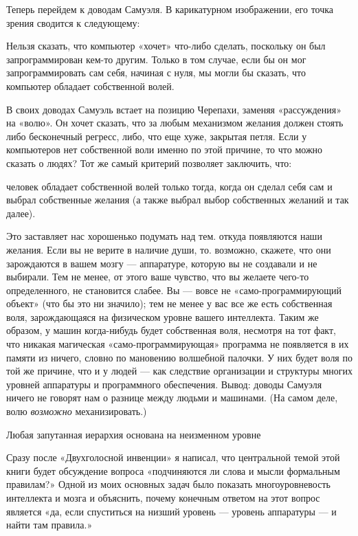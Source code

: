Теперь перейдем к доводам Самуэля. В карикатурном изображении, его точка зрения сводится к следующему:

Нельзя сказать, что компьютер «хочет» что-либо сделать, поскольку он был запрограммирован кем-то другим. Только в том случае, если бы он мог запрограммировать сам себя, начиная с нуля, мы могли бы сказать, что компьютер обладает собственной волей.

В своих доводах Самуэль встает на позицию Черепахи, заменяя «рассуждения» на «волю». Он хочет сказать, что за любым механизмом желания должен стоять либо бесконечный регресс, либо, что еще хуже, закрытая петля. Если у компьютеров нет собственной воли именно по этой причине, то что можно сказать о людях? Тот же самый критерий позволяет заключить, что:

человек обладает собственной волей только тогда, когда он сделал себя сам и выбрал собственные желания (а также выбрал выбор собственных желаний и так далее).

Это заставляет нас хорошенько подумать над тем. откуда появляются наши желания. Если вы не верите в наличие души, то. возможно, скажете, что они зарождаются в вашем мозгу --- аппаратуре, которую вы не создавали и не выбирали. Тем не менее, от этого ваше чувство, что вы желаете чего-то определенного, не становится слабее. Вы --- вовсе не «само-программирующий объект» (что бы это ни значило); тем не менее у вас все же есть собственная воля, зарождающаяся на физическом уровне вашего интеллекта. Таким же образом, у машин когда-нибудь будет собственная воля, несмотря на тот факт, что никакая магическая «само-программирующая» программа не появляется в их памяти из ничего, словно по мановению волшебной палочки. У них будет воля по той же причине, что и у людей --- как следствие организации и структуры многих уровней аппаратуры и программного обеспечения. Вывод: доводы Самуэля ничего не говорят нам о разнице между людьми и машинами. (На самом деле, волю \emph{возможно} механизировать.)

Любая запутанная иерархия основана на неизменном уровне

Сразу после «Двухголосной инвенции» я написал, что центральной темой этой книги будет обсуждение вопроса «подчиняются ли слова и мысли формальным правилам?» Одной из моих основных задач было показать многоуровневость интеллекта и мозга и объяснить, почему конечным ответом на этот вопрос является «да, если спуститься на низший уровень --- уровень аппаратуры --- и найти там правила.»

